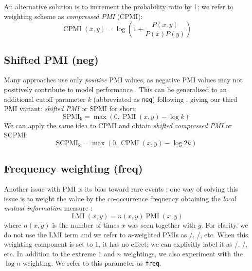 An alternative solution is to increment the probability ratio by 1; we refer to weighting scheme as \emph{compressed PMI} (CPMI):
%
\begin{equation}
  \label{eq:cpmi}
  \operatorname{CPMI}(x, y) = \log\left( 1 +  \frac{P(x,y)}{P(x)P(y)} \right)
\end{equation}

\subsection{Shifted PMI (neg)}
\label{sec:shifted-pmi}

Many approaches use only \emph{positive} PMI values, as  negative PMI values may not positively contribute to model performance \cite{Turney:2010:FMV:1861751.1861756}. This can be generalised to an additional cutoff parameter $k$ (abbreviated as \texttt{neg}) following , giving our third PMI variant: \emph{shifted PMI} or SPMI for short:
%
\begin{equation}
  \label{eq:ppmi}
  \operatorname{SPMI_k} = \max (0, \operatorname{PMI}(x, y) - \log k)
\end{equation}
%
We can apply the same idea to CPMI and obtain \emph{shifted compressed PMI} or SCPMI:
%
\begin{equation}
  \label{eq:pcpmi}
  \operatorname{SCPMI_k} = \max (0, \operatorname{CPMI}(x, y) - \log 2k)
\end{equation}

\subsection{Frequency weighting (freq)}
\label{sec:frequency-weighting}

Another issue with PMI is its bias toward rare events \cite{TACL570}; one way of solving this issue is to weight the value by the co-occurrence frequency obtaining the \emph{local mutual information} measure \cite{Evert05}:
%
\begin{equation}
  \label{eq:lmi}
  \operatorname{LMI}(x, y) = n(x, y)\operatorname{PMI}(x, y)
\end{equation}
%
where $n(x, y)$ is the number of times $x$ was seen together with $y$. For clarity, we do not use the LMI term and we refer to $n$-weighted PMIs as \NPMI/, \NSPMI/, etc. When this weighting component is set to 1, it has no effect; we can explicitly label it as \PMI/, \SPMI/, etc. In addition to the extreme $1$ and $n$ weightings, we also experiment with the $\log n$ weighting. We refer to this parameter as \texttt{freq}.

